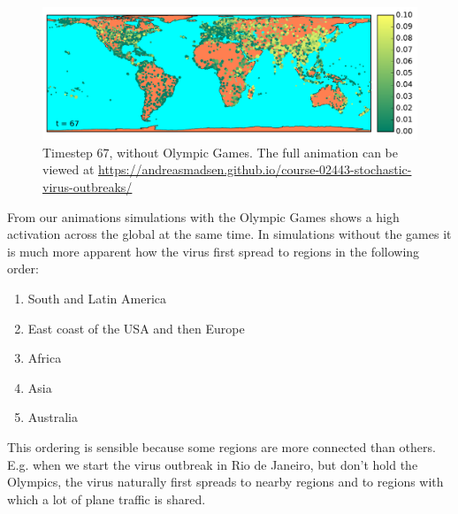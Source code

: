 \begin{figure}[H]
	\centering
	\includegraphics[width=1.0 \linewidth]{plots/gifs/frames/noRio-67}
	\caption{Timestep 67, without Olympic Games. The full animation can be viewed at
		\url{https://andreasmadsen.github.io/course-02443-stochastic-virus-outbreaks/}}
	\label{fig:noRio-67}
\end{figure}

From our animations simulations with the Olympic Games shows a high activation across the global at the same time. In simulations without the games it is much more apparent how the virus first spread to regions in the following order:
\begin{enumerate}
	\item South and Latin America
	\item East coast of the USA and then Europe
	\item Africa
	\item Asia
	\item Australia
\end{enumerate}

This ordering is sensible because some regions are more connected than others. E.g. when we start the virus outbreak in Rio de Janeiro, but don't hold the Olympics, the virus naturally first spreads to nearby regions and to regions with which a lot of plane traffic is shared.
